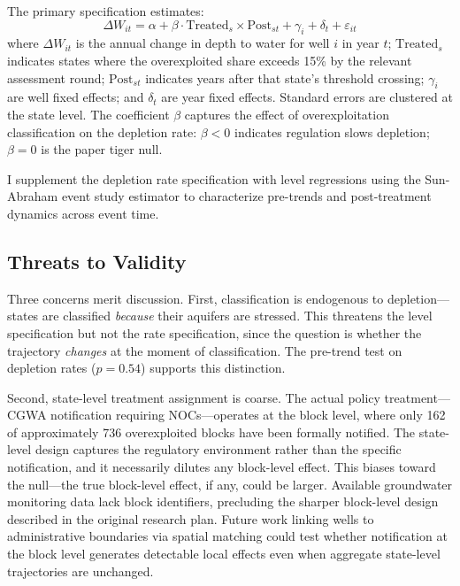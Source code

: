 \documentclass[12pt]{article}
\begin{document}
The primary specification estimates:
\begin{equation}
\Delta W_{it} = \alpha + \beta \cdot \text{Treated}_s \times \text{Post}_{st} + \gamma_i + \delta_t + \varepsilon_{it}
\label{eq:main}
\end{equation}
where $\Delta W_{it}$ is the annual change in depth to water for well $i$ in year $t$; $\text{Treated}_s$ indicates states where the overexploited share exceeds 15\% by the relevant assessment round; $\text{Post}_{st}$ indicates years after that state's threshold crossing; $\gamma_i$ are well fixed effects; and $\delta_t$ are year fixed effects. Standard errors are clustered at the state level. The coefficient $\beta$ captures the effect of overexploitation classification on the depletion rate: $\beta < 0$ indicates regulation slows depletion; $\beta = 0$ is the paper tiger null.

I supplement the depletion rate specification with level regressions using the Sun-Abraham event study estimator \citep{sun2021estimating} to characterize pre-trends and post-treatment dynamics across event time.

\subsection{Threats to Validity}

Three concerns merit discussion. First, classification is endogenous to depletion---states are classified \textit{because} their aquifers are stressed. This threatens the level specification but not the rate specification, since the question is whether the trajectory \textit{changes} at the moment of classification. The pre-trend test on depletion rates ($p = 0.54$) supports this distinction.

Second, state-level treatment assignment is coarse. The actual policy treatment---CGWA notification requiring NOCs---operates at the block level, where only 162 of approximately 736 overexploited blocks have been formally notified. The state-level design captures the regulatory environment rather than the specific notification, and it necessarily dilutes any block-level effect. This biases toward the null---the true block-level effect, if any, could be larger. Available groundwater monitoring data lack block identifiers, precluding the sharper block-level design described in the original research plan. Future work linking wells to administrative boundaries via spatial matching could test whether notification at the block level generates detectable local effects even when aggregate state-level trajectories are unchanged.
\end{document}
